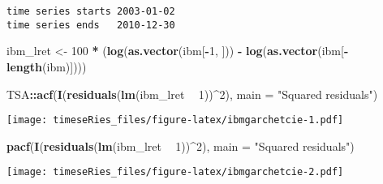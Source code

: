 \documentclass[]{book}
\newenvironment{Shaded}{\begin{snugshade}}{\end{snugshade}}
\newcommand{\DataTypeTok}[1]{\textcolor[rgb]{0.13,0.29,0.53}{#1}}
\newcommand{\DecValTok}[1]{\textcolor[rgb]{0.00,0.00,0.81}{#1}}
\newcommand{\KeywordTok}[1]{\textcolor[rgb]{0.13,0.29,0.53}{\textbf{#1}}}
\newcommand{\NormalTok}[1]{#1}
\newcommand{\OperatorTok}[1]{\textcolor[rgb]{0.81,0.36,0.00}{\textbf{#1}}}
\newcommand{\StringTok}[1]{\textcolor[rgb]{0.31,0.60,0.02}{#1}}
\begin{document}
\begin{verbatim}
time series starts 2003-01-02
time series ends   2010-12-30
\end{verbatim}

\begin{Shaded}
\begin{Highlighting}[]
\NormalTok{ibm_lret <-}\StringTok{ }\DecValTok{100} \OperatorTok{*}\StringTok{ }\NormalTok{(}\KeywordTok{log}\NormalTok{(}\KeywordTok{as.vector}\NormalTok{(ibm[}\OperatorTok{-}\DecValTok{1}\NormalTok{, ])) }\OperatorTok{-}\StringTok{ }\KeywordTok{log}\NormalTok{(}\KeywordTok{as.vector}\NormalTok{(ibm[}\OperatorTok{-}\KeywordTok{length}\NormalTok{(ibm)])))}

\NormalTok{TSA}\OperatorTok{::}\KeywordTok{acf}\NormalTok{(}\KeywordTok{I}\NormalTok{(}\KeywordTok{residuals}\NormalTok{(}\KeywordTok{lm}\NormalTok{(ibm_lret }\OperatorTok{~}\StringTok{ }\DecValTok{1}\NormalTok{))}\OperatorTok{^}\DecValTok{2}\NormalTok{), }\DataTypeTok{main =} \StringTok{"Squared residuals"}\NormalTok{)}
\end{Highlighting}
\end{Shaded}

\texttt{[image: timeseRies\_files/figure-latex/ibmgarchetcie-1.pdf]}

\begin{Shaded}
\begin{Highlighting}[]
\KeywordTok{pacf}\NormalTok{(}\KeywordTok{I}\NormalTok{(}\KeywordTok{residuals}\NormalTok{(}\KeywordTok{lm}\NormalTok{(ibm_lret }\OperatorTok{~}\StringTok{ }\DecValTok{1}\NormalTok{))}\OperatorTok{^}\DecValTok{2}\NormalTok{), }\DataTypeTok{main =} \StringTok{"Squared residuals"}\NormalTok{)}
\end{Highlighting}
\end{Shaded}

\texttt{[image: timeseRies\_files/figure-latex/ibmgarchetcie-2.pdf]}
\end{document}
